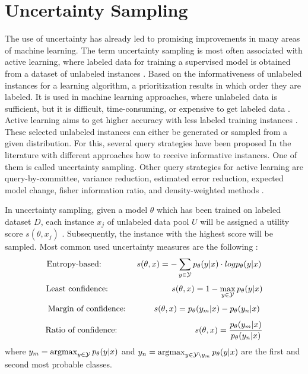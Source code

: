 \section{Uncertainty Sampling} 
\label{sec:uncertaintysampling}
%
The use of uncertainty has already led to promising improvements in many areas of machine learning.
The term uncertainty sampling is most often associated with active learning, where labeled data for training a supervised model is obtained from a dataset of unlabeled instances \cite{Settles2009ActiveLL}.
Based on the informativeness of unlabeled instances for a learning algorithm, a prioritization results in which order they are labeled.
It is used in machine learning approaches, where unlabeled data is sufficient, but it is difficult, time-consuming, or expensive to get labeled data \cite{Settles2009ActiveLL}.
Active learning aims to get higher accuracy with less labeled training instances \cite{Settles2009ActiveLL}.
These selected unlabeled instances can either be generated or sampled from a given distribution.
For this, several query strategies have been proposed In the literature with different approaches how to receive informative instances.
One of them is called uncertainty sampling.
Other query strategies for active learning are query-by-committee, variance reduction, estimated error reduction, expected model change, fisher information ratio, and density-weighted methods \cite{Settles2009ActiveLL}.

In uncertainty sampling, given a model $\theta$ which has been trained on labeled dataset $D$, each instance $x_j$ of unlabeled data pool $U$ will be assigned a utility score $s(\theta, x_j)$ \cite{nguyen2021howtomeasure}.
Subsequently, the instance with the highest score will be sampled.
Most common used uncertainty measures are the following \cite{human-in-the-loop}:
\begin{equation}
    \text{Entropy-based:}\hspace{15mm} \label{eqn:entropy_def}
     s(\theta, x) = - \sum_{y \in \mathcal{Y}}{p_{\theta}(y | x) \cdot log p_{\theta}(y|x)}
\end{equation}
\begin{equation}
    \text{Least confidence:}\hspace{27mm} \label{eqn:least_confidence_def}
     s(\theta, x) = 1 - \max_{y \in \mathcal{Y}}{p_{\theta}(y | x)}
\end{equation}
\begin{equation}
    \text{Margin of confidence:}\hspace{12mm} \label{eqn:margin_of_confidence_def}
    s(\theta, x) = p_{\theta}(y_m | x) - p_{\theta}(y_n|x)
\end{equation}
\begin{equation} \label{eqn:ratio_of_confidence_def}
    \text{Ratio of confidence:}\hspace{33mm}
    s(\theta, x) = \frac{p_{\theta}(y_m | x)}{p_{\theta}(y_n|x)}
\end{equation}
where
$y_m = \operatorname*{argmax}_{y \in \mathcal{Y}} p_{\theta}(y | x)$ 
and 
$y_n = \operatorname*{argmax}_{y \in \mathcal{Y} \setminus y_m}{p_{\theta}(y | x)}$ are the first and second most probable classes.

